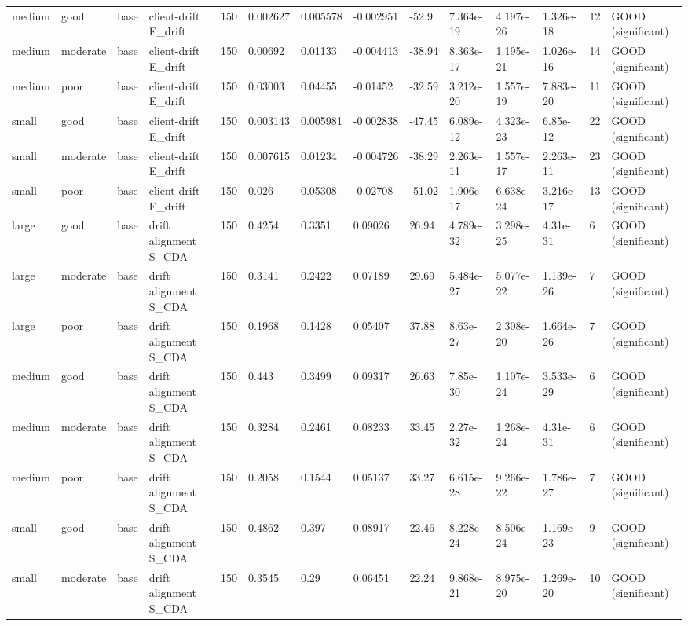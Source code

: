 \begin{table}[t]
\begin{tabular}{llllllllllllll}
medium & good & base & client-drift E\_drift & 150 & 0.002627 & 0.005578 & -0.002951 & -52.9 & 7.364e-19 & 4.197e-26 & 1.326e-18 & 12 & GOOD (significant) \\
medium & moderate & base & client-drift E\_drift & 150 & 0.00692 & 0.01133 & -0.004413 & -38.94 & 8.363e-17 & 1.195e-21 & 1.026e-16 & 14 & GOOD (significant) \\
medium & poor & base & client-drift E\_drift & 150 & 0.03003 & 0.04455 & -0.01452 & -32.59 & 3.212e-20 & 1.557e-19 & 7.883e-20 & 11 & GOOD (significant) \\
small & good & base & client-drift E\_drift & 150 & 0.003143 & 0.005981 & -0.002838 & -47.45 & 6.089e-12 & 4.323e-23 & 6.85e-12 & 22 & GOOD (significant) \\
small & moderate & base & client-drift E\_drift & 150 & 0.007615 & 0.01234 & -0.004726 & -38.29 & 2.263e-11 & 1.557e-17 & 2.263e-11 & 23 & GOOD (significant) \\
small & poor & base & client-drift E\_drift & 150 & 0.026 & 0.05308 & -0.02708 & -51.02 & 1.906e-17 & 6.638e-24 & 3.216e-17 & 13 & GOOD (significant) \\
large & good & base & drift alignment S\_CDA & 150 & 0.4254 & 0.3351 & 0.09026 & 26.94 & 4.789e-32 & 3.298e-25 & 4.31e-31 & 6 & GOOD (significant) \\
large & moderate & base & drift alignment S\_CDA & 150 & 0.3141 & 0.2422 & 0.07189 & 29.69 & 5.484e-27 & 5.077e-22 & 1.139e-26 & 7 & GOOD (significant) \\
large & poor & base & drift alignment S\_CDA & 150 & 0.1968 & 0.1428 & 0.05407 & 37.88 & 8.63e-27 & 2.308e-20 & 1.664e-26 & 7 & GOOD (significant) \\
medium & good & base & drift alignment S\_CDA & 150 & 0.443 & 0.3499 & 0.09317 & 26.63 & 7.85e-30 & 1.107e-24 & 3.533e-29 & 6 & GOOD (significant) \\
medium & moderate & base & drift alignment S\_CDA & 150 & 0.3284 & 0.2461 & 0.08233 & 33.45 & 2.27e-32 & 1.268e-24 & 4.31e-31 & 6 & GOOD (significant) \\
medium & poor & base & drift alignment S\_CDA & 150 & 0.2058 & 0.1544 & 0.05137 & 33.27 & 6.615e-28 & 9.266e-22 & 1.786e-27 & 7 & GOOD (significant) \\
small & good & base & drift alignment S\_CDA & 150 & 0.4862 & 0.397 & 0.08917 & 22.46 & 8.228e-24 & 8.506e-24 & 1.169e-23 & 9 & GOOD (significant) \\
small & moderate & base & drift alignment S\_CDA & 150 & 0.3545 & 0.29 & 0.06451 & 22.24 & 9.868e-21 & 8.975e-20 & 1.269e-20 & 10 & GOOD (significant) \\

\end{tabular}
\end{table}
